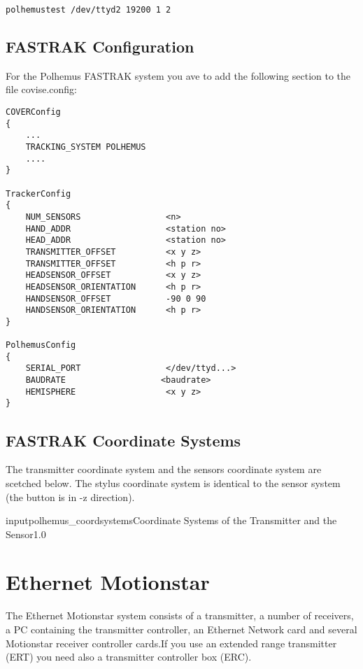 \small \begin{verbatim}
polhemustest /dev/ttyd2 19200 1 2
\end{verbatim} \normalsize

\subsection{FASTRAK Configuration}
For the Polhemus FASTRAK system you ave to add the following
section to the file covise.config:

\small \begin{verbatim}
COVERConfig
{
    ...
    TRACKING_SYSTEM POLHEMUS
    ....
}

TrackerConfig
{
    NUM_SENSORS                 <n>
    HAND_ADDR                   <station no>
    HEAD_ADDR                   <station no>
    TRANSMITTER_OFFSET          <x y z>
    TRANSMITTER_OFFSET          <h p r>
    HEADSENSOR_OFFSET           <x y z>
    HEADSENSOR_ORIENTATION      <h p r>
    HANDSENSOR_OFFSET           -90 0 90
    HANDSENSOR_ORIENTATION      <h p r>
}

PolhemusConfig
{
    SERIAL_PORT                 </dev/ttyd...>
    BAUDRATE                   <baudrate>
    HEMISPHERE                  <x y z>  
}
\end{verbatim} \normalsize

\subsection{FASTRAK Coordinate Systems}
The transmitter coordinate system and the sensors coordinate system
are scetched below. The stylus coordinate system is identical to the
sensor system (the button is in -z direction).

\begin{covimg}{input}{polhemus_coordsystems}{Coordinate Systems of the Transmitter and the Sensor}{1.0}\end{covimg}




\newpage


\section{Ethernet Motionstar}
The Ethernet Motionstar system consists of a transmitter, a number of receivers,
a PC containing the transmitter controller, an Ethernet Network card and several 
Motionstar receiver controller cards.If you use an extended range transmitter (ERT) 
you need also a transmitter controller box (ERC).

